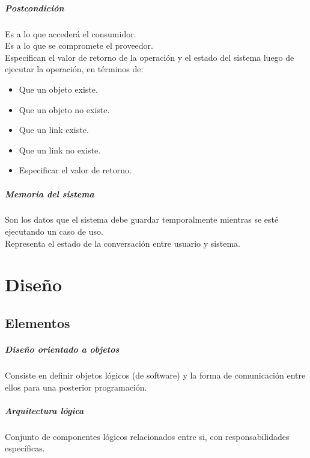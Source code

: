 \documentclass[a4paper,12pt,oneside]{report}
\begin{document}
        \paragraph{Postcondici\'on}
          Es a lo que acceder\'a el consumidor.\\
          Es a lo que se compromete el proveedor.\\
          Especifican el valor de retorno de la operaci\'on y el estado del sistema luego
          de ejecutar la operaci\'on, en t\'erminos de:
            \begin{itemize}
              \item Que un objeto existe.
              \item Que un objeto no existe.
              \item Que un link existe.
              \item Que un link no existe.
              \item Especificar el valor de retorno.
            \end{itemize}

        \paragraph{Memoria del sistema}
          Son los datos que el sistema debe guardar temporalmente mientras se est\'e
          ejecutando un caso de uso.\\
          Representa el estado de la conversaci\'on entre usuario y sistema.


  \chapter{Dise\~no}
  \thispagestyle{contenido} %
  \pagestyle{contenido}     %

    \section{Elementos}
        \paragraph{Dise\~no orientado a objetos}
          Consiste en definir objetos l\'ogicos (de software) y la forma de
          comunicaci\'on entre ellos para una posterior programaci\'on.

        \paragraph{Arquitectura l\'ogica}
          Conjunto de componentes l\'ogicos relacionados entre si, con
          responsabilidades espec\'ificas.
\end{document}
